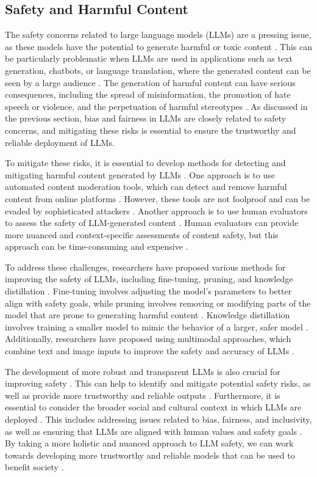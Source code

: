 \documentclass[11pt]{article}
\begin{document}
\subsection{Safety and Harmful Content}

The safety concerns related to large language models (LLMs) are a pressing issue, as these models have the potential to generate harmful or toxic content \cite{ref322}. This can be particularly problematic when LLMs are used in applications such as text generation, chatbots, or language translation, where the generated content can be seen by a large audience \cite{ref323}. The generation of harmful content can have serious consequences, including the spread of misinformation, the promotion of hate speech or violence, and the perpetuation of harmful stereotypes \cite{ref324}. As discussed in the previous section, bias and fairness in LLMs are closely related to safety concerns, and mitigating these risks is essential to ensure the trustworthy and reliable deployment of LLMs.

To mitigate these risks, it is essential to develop methods for detecting and mitigating harmful content generated by LLMs \cite{ref325}. One approach is to use automated content moderation tools, which can detect and remove harmful content from online platforms \cite{ref326}. However, these tools are not foolproof and can be evaded by sophisticated attackers \cite{ref327}. Another approach is to use human evaluators to assess the safety of LLM-generated content \cite{ref328}. Human evaluators can provide more nuanced and context-specific assessments of content safety, but this approach can be time-consuming and expensive \cite{ref329}.

To address these challenges, researchers have proposed various methods for improving the safety of LLMs, including fine-tuning, pruning, and knowledge distillation \cite{ref330}. Fine-tuning involves adjusting the model's parameters to better align with safety goals, while pruning involves removing or modifying parts of the model that are prone to generating harmful content \cite{ref331}. Knowledge distillation involves training a smaller model to mimic the behavior of a larger, safer model \cite{ref332}. Additionally, researchers have proposed using multimodal approaches, which combine text and image inputs to improve the safety and accuracy of LLMs \cite{ref333}.

The development of more robust and transparent LLMs is also crucial for improving safety \cite{ref334}. This can help to identify and mitigate potential safety risks, as well as provide more trustworthy and reliable outputs \cite{ref335}. Furthermore, it is essential to consider the broader social and cultural context in which LLMs are deployed \cite{ref336}. This includes addressing issues related to bias, fairness, and inclusivity, as well as ensuring that LLMs are aligned with human values and safety goals \cite{ref337}. By taking a more holistic and nuanced approach to LLM safety, we can work towards developing more trustworthy and reliable models that can be used to benefit society \cite{ref338}.
\end{document}
